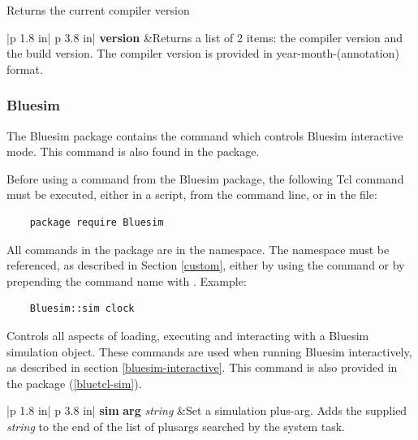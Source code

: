

Returns the current compiler version

\begin{tabular}{|p {1.8 in}| p {3.8 in}|}
\hline
\hline
{\bf version} &Returns a list of 2 items: the compiler version
and the build  version. The compiler version is
provided  in year-month-(annotation) format. \\
\hline
\hline
\end{tabular}


\subsubsection{Bluesim}

The Bluesim package contains the  command which controls
Bluesim interactive mode.  This command is also found in the
 package.

Before using a command from the Bluesim package,  the
following Tcl command must  be executed, either in a script, 
from the command line, or in the  file:
\begin{verbatim}
    package require Bluesim
\end{verbatim}

All commands in the  package are in the  
namespace.  The namespace must be referenced, as described in Section
\ref{custom}, either by using the  command or by
prepending the command name with .  Example:
\begin{verbatim}
    Bluesim::sim clock
\end{verbatim}


\label{bluesim-sim}

 Controls all aspects of loading, executing and interacting
with a Bluesim simulation object.  These commands are used when
running Bluesim interactively, as described in section \ref {bluesim-interactive}. 
This command is also provided in the  package (\ref{bluetcl-sim}).

\begin{tabular}{|p {1.8 in}| p {3.8 in}|}
\hline
\hline
{\bf sim} {\bf arg} {\em string} &Set a simulation plus-arg. Adds the supplied
{\em string} to the end of the list of plusargs searched by the
 system task. \\
\hline
\end{tabular}

